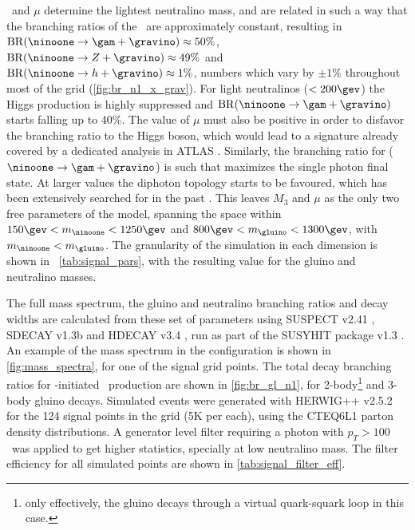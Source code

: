 \Mone\ and $\mu$ determine the lightest neutralino mass, and are related in such a way that the branching ratios of the \ninoone\ are approximately constant,
resulting in ${\rm BR}(\ninoone \to \gam + \gravino) \approx 50\%$, ${\rm BR}(\ninoone \to Z + \gravino) \approx 49\%$ and ${\rm BR}(\ninoone \to h + \gravino) \approx 1\%$,
numbers which vary by $\pm 1\%$ throughout most of the grid (\Fig \ref{fig:br_n1_x_grav}). For light neutralinos ($<200\gev$) the Higgs production is highly
suppressed and ${\rm BR}(\ninoone \to \gam + \gravino)$ starts falling up to 40\%. The value of $\mu$ must also be positive in order to disfavor the branching ratio
to the Higgs boson, which would lead to a signature already covered by a dedicated analysis in ATLAS \cite{Aad:2012jva}. Similarly, the branching ratio for
($\ninoone \to \gam + \gravino$) is such that maximizes the single photon final state. At larger values the diphoton topology starts to be favoured, which has been
extensively searched for in the past \cite{Aad2012519,Aad:2011kz}. This leaves $M_3$ and $\mu$ as the only two free parameters of the model, spanning the space
within $150\gev < m_{\ninoone} < 1250 \gev$ and $800\gev < m_{\gluino} < 1300 \gev$, with $m_{\ninoone} < m_{\gluino}$. The granularity of the simulation in each
dimension is shown in \Tab\ \ref{tab:signal_pars}, with the resulting value for the gluino and neutralino masses.

The full mass spectrum, the gluino and neutralino branching ratios and decay widths are calculated from
these set of parameters using SUSPECT v2.41 \cite{Djouadi2007426}, SDECAY v1.3b \cite{Muhlleitner:2004mka}
and HDECAY v3.4 \cite{Djouadi:1997yw}, run as part of the SUSYHIT package v1.3 \cite{Djouadi:2006bz}.
An example of the mass spectrum in the configuration is shown in \Fig \ref{fig:mass_spectra}, for one of
the signal grid points. The total decay branching ratios for \gluino-initiated \ninoone\ production are
shown in \Fig \ref{fig:br_gl_n1}, for 2-body\footnote{only effectively, the gluino decays through a virtual
quark-squark loop in this case.} and 3-body gluino decays.
Simulated events were generated with HERWIG++ v2.5.2 \cite{Bahr:2008pv} for the 124 signal points in the
grid (5K per each), using the CTEQ6L1 \cite{Nadolsky:2008zw} parton density distributions. A generator level
filter requiring a photon with $p_{T}>100~$ \gev\ was applied to get higher statistics, specially at low neutralino
mass. The filter efficiency for all simulated points are shown in \Tab \ref{tab:signal_filter_eff}.

